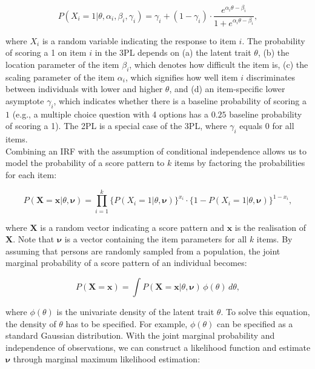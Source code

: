 \documentclass[Royal,sageapa,times,doublespace]{sagej}
\begin{document}
\begin{equation}
P(X_i = 1 | \theta, \alpha_{i}, \beta_{i}, \gamma_{i}) = \gamma_{i} + (1 - \gamma_{i}) \cdot 
\frac{e^{\alpha_{i}\theta - \beta_{i}}}{1 + e^{\alpha_{i}\theta - \beta_{i}}},
\end{equation}

where $X_i$ is a random variable indicating the response to item $i$. The probability of scoring a 1 on item $i$ in the 3PL depends on (a) the latent trait $\theta$, (b) the location parameter of the item $\beta_{i}$, which denotes how difficult the item is, (c) the scaling parameter of the item $\alpha_{i}$, which signifies how well item $i$ discriminates between individuals with lower and higher $\theta$, and (d) an item-specific lower asymptote $\gamma_{i}$, which indicates whether there is a baseline probability of scoring a $1$ (e.g., a multiple choice question with 4 options has a $0.25$ baseline probability of scoring a 1). The 2PL is a special case of the 3PL, where $\gamma_{i}$ equals $0$ for all items. \\
\indent Combining an IRF with the assumption of conditional independence allows us to model the probability of a score pattern to $k$ items by factoring the probabilities for each item:

\begin{equation}
P(\boldsymbol{X} = \boldsymbol{x} | \theta, \boldsymbol{\nu}) = \prod_{i=1}^{k} \{P(X_i = 1 | \theta, \boldsymbol{\nu})\}^{x_i} \cdot  \{1 - P(X_i = 1 | \theta, \boldsymbol{\nu}) \}^{1 - x_i},
\end{equation}

where $\boldsymbol{X}$ is a random vector indicating a score pattern and $\boldsymbol{x}$ is the realisation of $\boldsymbol{X}$. Note that $\boldsymbol{\nu}$ is a vector containing the item parameters for all $k$ items. By assuming that persons are randomly sampled from a population, the joint marginal probability of a score pattern of an individual becomes:

\begin{equation}
P(\boldsymbol{X} = \boldsymbol{x}) = \int P(\boldsymbol{X} = \boldsymbol{x} | \theta, \boldsymbol{\nu}) \,\phi(\theta)\,d\theta,
\end{equation}

where $\phi(\theta)$ is the univariate density of the latent trait $\theta$. To solve this equation, the density of $\theta$ has to be specified. For example, $\phi(\theta)$ can be specified as a standard Gaussian distribution. With the joint marginal probability and independence of observations, we can construct a likelihood function and estimate $\boldsymbol{\nu}$ through marginal maximum likelihood estimation:
\end{document}
